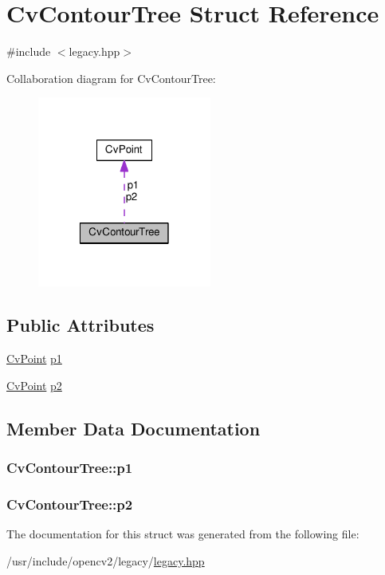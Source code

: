 \hypertarget{structCvContourTree}{\section{Cv\-Contour\-Tree Struct Reference}
\label{structCvContourTree}
}


{\ttfamily \#include $<$legacy.\-hpp$>$}



Collaboration diagram for Cv\-Contour\-Tree\-:\nopagebreak
\begin{figure}[H]
\begin{center}
\leavevmode
\includegraphics[width=162pt]{structCvContourTree__coll__graph}
\end{center}
\end{figure}
\subsection*{Public Attributes}
\begin{DoxyCompactItemize}
\item 
\hyperlink{structCvPoint}{Cv\-Point} \hyperlink{structCvContourTree_ae93d5eaff425a4d30c518490f2345888}{p1}
\item 
\hyperlink{structCvPoint}{Cv\-Point} \hyperlink{structCvContourTree_aa2e801818ebee167017c5dc7c7148858}{p2}
\end{DoxyCompactItemize}


\subsection{Member Data Documentation}
\hypertarget{structCvContourTree_ae93d5eaff425a4d30c518490f2345888}{
\subsubsection[{p1}]{ Cv\-Contour\-Tree\-::p1}}\label{structCvContourTree_ae93d5eaff425a4d30c518490f2345888}
\hypertarget{structCvContourTree_aa2e801818ebee167017c5dc7c7148858}{
\subsubsection[{p2}]{ Cv\-Contour\-Tree\-::p2}}\label{structCvContourTree_aa2e801818ebee167017c5dc7c7148858}


The documentation for this struct was generated from the following file\-:\begin{DoxyCompactItemize}
\item 
/usr/include/opencv2/legacy/\hyperlink{legacy_8hpp}{legacy.\-hpp}\end{DoxyCompactItemize}

